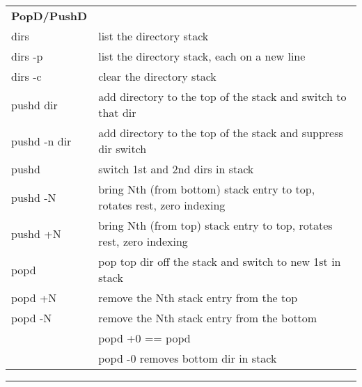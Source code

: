 \documentclass[11pt]{article}
\begin{document}
\bigskip\bigskip

\centering
{}
\begin{tabular}{| l | l |}
  \hline \hline
  \textbf{PopD/PushD} & \\
  dirs         & list the directory stack \\
  dirs -p      & list the directory stack, each on a new line \\
  dirs -c      & clear the directory stack \\
  pushd dir    & add directory to the top of the stack and switch to that dir \\
  pushd -n dir & add directory to the top of the stack and suppress dir switch \\
  pushd        & switch 1st and 2nd dirs in stack \\
  pushd -N     & bring Nth (from bottom) stack entry to top, rotates rest, zero indexing \\
  pushd +N     & bring Nth (from top) stack entry to top, rotates rest, zero indexing \\
  popd         & pop top dir off the stack and switch to new 1st in stack \\
  popd +N      & remove the Nth stack entry from the top \\
  popd -N      & remove the Nth stack entry from the bottom \\
               & popd +0 == popd \\
               & popd -0 removes bottom dir in stack \\
  \hline \hline
\end{tabular}


\def \hzline{\rule[0mm]{\textwidth}{1pt}}
\vfill \noindent \hzline \\ 
\end{document}
